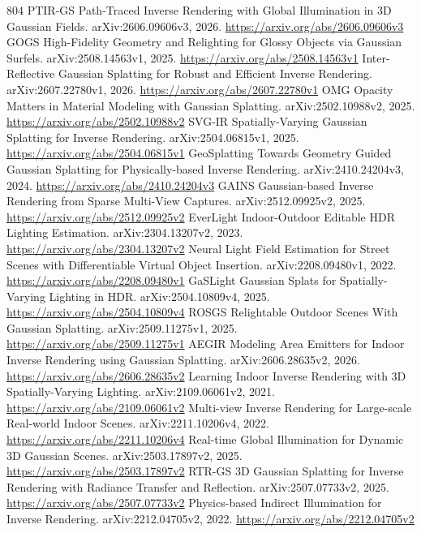 \documentclass[11pt]{article}
\begin{document}
\begin{thebibliography}{804}
 PTIR-GS Path-Traced Inverse Rendering with Global Illumination in 3D Gaussian Fields. arXiv:2606.09606v3, 2026. \url{https://arxiv.org/abs/2606.09606v3}
 GOGS High-Fidelity Geometry and Relighting for Glossy Objects via Gaussian Surfels. arXiv:2508.14563v1, 2025. \url{https://arxiv.org/abs/2508.14563v1}
 Inter-Reflective Gaussian Splatting for Robust and Efficient Inverse Rendering. arXiv:2607.22780v1, 2026. \url{https://arxiv.org/abs/2607.22780v1}
 OMG Opacity Matters in Material Modeling with Gaussian Splatting. arXiv:2502.10988v2, 2025. \url{https://arxiv.org/abs/2502.10988v2}
 SVG-IR Spatially-Varying Gaussian Splatting for Inverse Rendering. arXiv:2504.06815v1, 2025. \url{https://arxiv.org/abs/2504.06815v1}
 GeoSplatting Towards Geometry Guided Gaussian Splatting for Physically-based Inverse Rendering. arXiv:2410.24204v3, 2024. \url{https://arxiv.org/abs/2410.24204v3}
 GAINS Gaussian-based Inverse Rendering from Sparse Multi-View Captures. arXiv:2512.09925v2, 2025. \url{https://arxiv.org/abs/2512.09925v2}
 EverLight Indoor-Outdoor Editable HDR Lighting Estimation. arXiv:2304.13207v2, 2023. \url{https://arxiv.org/abs/2304.13207v2}
 Neural Light Field Estimation for Street Scenes with Differentiable Virtual Object Insertion. arXiv:2208.09480v1, 2022. \url{https://arxiv.org/abs/2208.09480v1}
 GaSLight Gaussian Splats for Spatially-Varying Lighting in HDR. arXiv:2504.10809v4, 2025. \url{https://arxiv.org/abs/2504.10809v4}
 ROSGS Relightable Outdoor Scenes With Gaussian Splatting. arXiv:2509.11275v1, 2025. \url{https://arxiv.org/abs/2509.11275v1}
 AEGIR Modeling Area Emitters for Indoor Inverse Rendering using Gaussian Splatting. arXiv:2606.28635v2, 2026. \url{https://arxiv.org/abs/2606.28635v2}
 Learning Indoor Inverse Rendering with 3D Spatially-Varying Lighting. arXiv:2109.06061v2, 2021. \url{https://arxiv.org/abs/2109.06061v2}
 Multi-view Inverse Rendering for Large-scale Real-world Indoor Scenes. arXiv:2211.10206v4, 2022. \url{https://arxiv.org/abs/2211.10206v4}
 Real-time Global Illumination for Dynamic 3D Gaussian Scenes. arXiv:2503.17897v2, 2025. \url{https://arxiv.org/abs/2503.17897v2}
 RTR-GS 3D Gaussian Splatting for Inverse Rendering with Radiance Transfer and Reflection. arXiv:2507.07733v2, 2025. \url{https://arxiv.org/abs/2507.07733v2}
 Physics-based Indirect Illumination for Inverse Rendering. arXiv:2212.04705v2, 2022. \url{https://arxiv.org/abs/2212.04705v2}

\end{thebibliography}
\end{document}
